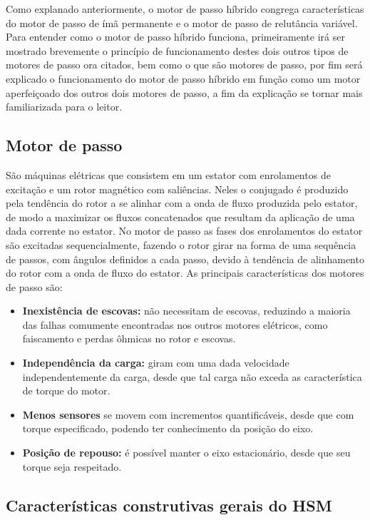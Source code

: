 Como explanado anteriormente, o motor de passo híbrido congrega características do motor de passo de ímã permanente e o motor de passo de relutância variável. Para entender como o motor de passo híbrido funciona, primeiramente irá ser mostrado brevemente o princípio de funcionamento destes dois outros tipos de motores de passo ora citados, bem como o que são motores de passo, por fim será explicado o funcionamento do motor de passo híbrido em função como um motor aperfeiçoado dos outros dois motores de passo, a fim da explicação se tornar mais familiarizada para o leitor.  

	\subsection{Motor de passo}
	São máquinas elétricas que consistem em um estator com enrolamentos de excitação e um rotor magnético com saliências. Neles o conjugado é produzido pela tendência do rotor a se alinhar com a onda de fluxo produzida pelo estator, de modo a maximizar os fluxos concatenados que resultam da aplicação de uma dada corrente no estator. No motor de passo as fases dos enrolamentos do estator são excitadas sequencialmente, fazendo o rotor girar na forma de uma sequência de passos, com ângulos definidos a cada passo, devido à tendência de alinhamento do rotor com a onda de fluxo do estator. \cite{Fitz} As principais características dos motores de passo são: \cite{MoonsHSM} 
	
	\begin{itemize}
		\item \textbf{Inexistência de escovas:} não necessitam de escovas, reduzindo a maioria das falhas comumente encontradas nos outros motores elétricos, como faiscamento e perdas ôhmicas no rotor e escovas.
		\item \textbf{Independência da carga:} giram com uma dada velocidade independentemente da carga, desde que tal carga não exceda as característica de torque do motor.
		\item \textbf{Menos sensores} se movem com incrementos quantificáveis, desde que com torque especificado, podendo ter conhecimento da posição do eixo.
		\item \textbf{Posição de repouso:} é possível manter o eixo estacionário, desde que seu torque seja respeitado. 
	\end{itemize}
	
	\subsection{Características construtivas gerais do HSM}
	
